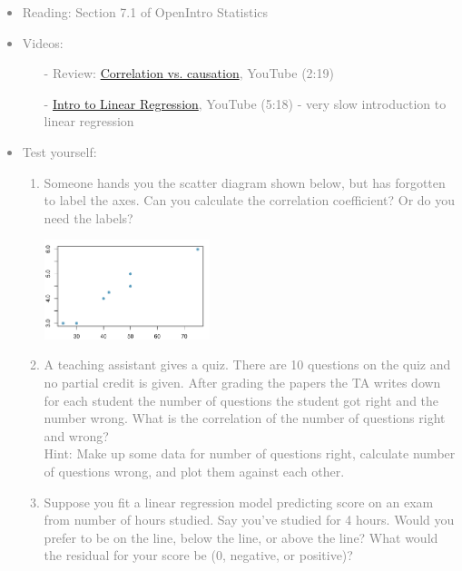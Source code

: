 \documentclass[11pt]{article}
\newcommand{\gray}[1]{\textcolor{gray}{#1}}
\begin{document}
\gray{
{\it
\vspace{-0.55cm}
\begin{itemize}
\renewcommand{\labelitemi}{{\textcolor{dark}{$\ast$}}}
\item Reading: Section 7.1 of OpenIntro Statistics
\item Videos: 
\begin{itemize}
\item[-] Review: \href{http://www.youtube.com/watch?v=5zyruPbgxyM}{Correlation vs. causation}, YouTube (2:19)
\item[-] \href{http://www.youtube.com/watch?v=zPG4NjIkCjc}{Intro to Linear Regression}, YouTube (5:18) - very slow introduction to linear regression
\end{itemize}
\item Test yourself:
\begin{enumerate}
\item Someone hands you the scatter diagram shown below, but has forgotten to label the axes. Can you calculate the correlation coefficient? Or do you need the labels?
\begin{center}
\includegraphics[width=0.4\textwidth]{figures/no_labels}
\end{center}
\item A teaching assistant gives a quiz. There are 10 questions on the quiz and no partial credit is given. After grading the papers the TA writes down for each student the number of questions the student got right and the number wrong. What is the correlation of the number of questions right and wrong? \\
Hint: Make up some data for number of questions right, calculate number of questions wrong, and plot them against each other.
\item Suppose you fit a linear regression model predicting score on an exam from number of hours studied. Say you've studied for 4 hours. Would you prefer to be on the line, below the line, or above the line? What would the residual for your score be (0, negative, or positive)?
\end{enumerate}
\end{itemize}
}}
\end{document}
